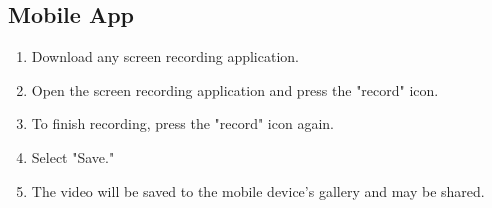 \subsection{Mobile App}
\begin{enumerate}
    \item Download any screen recording application. 
    \item Open the screen recording application and press the "record" icon.
    \item To finish recording, press the "record" icon again. 
    \item Select "Save."
    \item The video will be saved to the mobile device's gallery and may be shared.
\end{enumerate}

%
%
%
%
%
%
%
%
